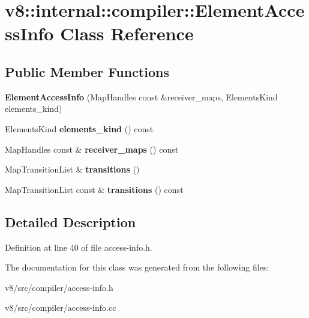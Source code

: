 \hypertarget{classv8_1_1internal_1_1compiler_1_1ElementAccessInfo}{}\section{v8\+:\+:internal\+:\+:compiler\+:\+:Element\+Access\+Info Class Reference}
\label{classv8_1_1internal_1_1compiler_1_1ElementAccessInfo}
\subsection*{Public Member Functions}
\begin{DoxyCompactItemize}
\item 
\mbox{\label{classv8_1_1internal_1_1compiler_1_1ElementAccessInfo_a4a7eb68cfbcfdf1088fabae1bdfdc5e6}} 
{\bfseries Element\+Access\+Info} (Map\+Handles const \&receiver\+\_\+maps, Elements\+Kind elements\+\_\+kind)
\item 
\mbox{\label{classv8_1_1internal_1_1compiler_1_1ElementAccessInfo_a8976fe0fac527e278b516f7eade986a9}} 
Elements\+Kind {\bfseries elements\+\_\+kind} () const
\item 
\mbox{\label{classv8_1_1internal_1_1compiler_1_1ElementAccessInfo_ae7610a1a2ada54ed90a3cefa283cdb90}} 
Map\+Handles const  \& {\bfseries receiver\+\_\+maps} () const
\item 
\mbox{\label{classv8_1_1internal_1_1compiler_1_1ElementAccessInfo_a03ecd9574b5ed3fd67c9f3c6f0f1533e}} 
Map\+Transition\+List \& {\bfseries transitions} ()
\item 
\mbox{\label{classv8_1_1internal_1_1compiler_1_1ElementAccessInfo_a56f66aacdfa26897734bbf5c1464ab37}} 
Map\+Transition\+List const  \& {\bfseries transitions} () const
\end{DoxyCompactItemize}


\subsection{Detailed Description}


Definition at line 40 of file access-\/info.\+h.



The documentation for this class was generated from the following files\+:\begin{DoxyCompactItemize}
\item 
v8/src/compiler/access-\/info.\+h\item 
v8/src/compiler/access-\/info.\+cc\end{DoxyCompactItemize}
